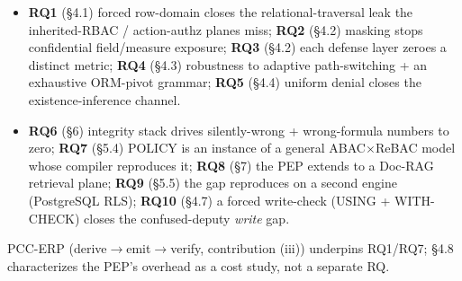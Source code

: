 \documentclass[11pt,a4paper]{article}
\begin{document}
\begin{itemize}[leftmargin=*,nosep]
  \item \textbf{RQ1} (\S4.1) forced row-domain closes the relational-traversal leak the inherited-RBAC /
        action-authz planes miss; \textbf{RQ2} (\S4.2) masking stops confidential field/measure exposure;
        \textbf{RQ3} (\S4.2) each defense layer zeroes a distinct metric; \textbf{RQ4} (\S4.3) robustness to
        adaptive path-switching + an exhaustive ORM-pivot grammar; \textbf{RQ5} (\S4.4) uniform denial closes the
        existence-inference channel.
  \item \textbf{RQ6} (\S6) integrity stack drives silently-wrong + wrong-formula numbers to zero; \textbf{RQ7}
        (\S5.4) POLICY is an instance of a general ABAC$\times$ReBAC model whose compiler reproduces it;
        \textbf{RQ8} (\S7) the PEP extends to a Doc-RAG retrieval plane; \textbf{RQ9} (\S5.5) the gap reproduces
        on a second engine (PostgreSQL RLS); \textbf{RQ10} (\S4.7) a forced write-check (USING + WITH-CHECK)
        closes the confused-deputy \emph{write} gap.
\end{itemize}
\noindent PCC-ERP (derive$\to$emit$\to$verify, contribution (iii)) underpins RQ1/RQ7; \S4.8 characterizes the
PEP's overhead as a cost study, not a separate RQ.

\end{document}
